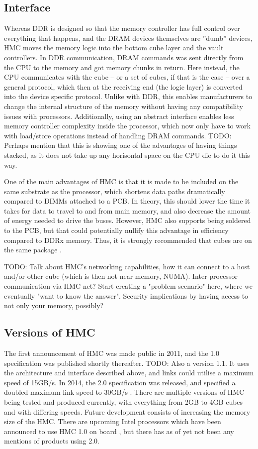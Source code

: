 \subsection{Interface}
Whereas DDR is designed so that the memory controller has full control over everything that happens, and the DRAM devices themselves are ''dumb'' devices, HMC moves the memory logic into the bottom cube layer and the vault controllers. In DDR communication, DRAM commands was sent directly from the CPU to the memory and got memory chunks in return. Here instead, the CPU communicates with the cube -- or a set of cubes, if that is the case -- over a general protocol, which then at the receiving end (the logic layer) is converted into the device specific protocol. Unlike with DDR, this enables manufacturers to change the internal structure of the memory without having any compatibility issues with processors. Additionally, using an abstract interface enables less memory controller complexity inside the processor, which now only have to work with load/store operations instead of handling DRAM commands. TODO: Perhaps mention that this is showing one of the advantages of having things stacked, as it does not take up any horisontal space on the CPU die to do it this way.
\bigskip

One of the main advantages of HMC is that it is made to be included on the same substrate as the processor, which shortens data paths dramatically compared to DIMMs attached to a PCB. In theory, this should lower the time it takes for data to travel to and from main memory, and also decrease the amount of energy needed to drive the buses. However, HMC also supports being soldered to the PCB, but that could potentially nullify this advantage in efficiency compared to DDRx memory. Thus, it is strongly recommended that cubes are on the same package \cite{hybrid2013hybrid}.
\bigskip

TODO: Talk about HMC's networking capabilities, how it can connect to a host and/or other cube (which is then not near memory, NUMA). Inter-processor communication via HMC net? Start creating a "problem scenario" here, where we eventually "want to know the answer". Security implications by having access to not only your memory, possibly?

\subsection{Versions of HMC}
The first announcement of HMC was made public in 2011, and the 1.0 specification was published shortly thereafter. TODO: Also a version 1.1. It uses the architecture and interface described above, and links could utilise a maximum speed of 15GB/s. In 2014, the 2.0 specification was released, and specified a doubled maximum link speed to 30GB/s \cite{hybrid2014hybrid}. There are multiple versions of HMC being tested and produced currently, with everything from 2GB to 4GB cubes and with differing speeds. Future development consists of increasing the memory size of the HMC. There are upcoming Intel processors which have been announced to use HMC 1.0 on board \cite{micron2014ikl}, but there has as of yet not been any mentions of products using 2.0. 



